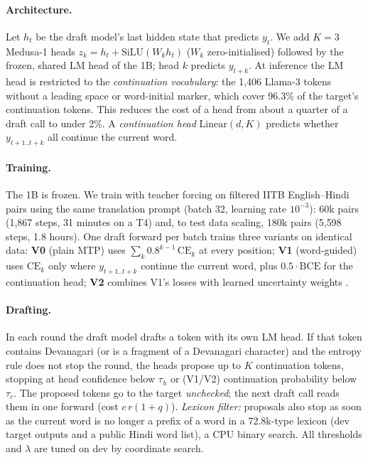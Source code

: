\documentclass[11pt]{article}
\begin{document}
\paragraph{Architecture.} Let $h_t$ be the draft model's last hidden state that predicts $y_t$. We add
$K=3$ Medusa-1 heads $z_k = h_t + \mathrm{SiLU}(W_k h_t)$ ($W_k$ zero-initialised) followed by the
frozen, shared LM head of the 1B; head $k$ predicts $y_{t+k}$. At inference the LM head is restricted
to the \emph{continuation vocabulary}: the 1{,}406 Llama-3 tokens without a leading space or
word-initial marker, which cover 96.3\% of the target's continuation tokens. This reduces the cost of a
head from about a quarter of a draft call to under 2\%. A \emph{continuation head}
$\mathrm{Linear}(d, K)$ predicts whether $y_{t+1..t+k}$ all continue the current word.

\paragraph{Training.} The 1B is frozen. We train with teacher forcing on filtered IITB English--Hindi
pairs \citep{kunchukuttan2018iitb} using the same translation prompt (batch 32, learning rate
$10^{-3}$): 60k pairs (1{,}867 steps, 31 minutes on a T4) and, to test data scaling, 180k pairs (5{,}598
steps, 1.8 hours). One draft forward per batch trains three variants on identical data:
\textbf{V0} (plain MTP) uses $\sum_k 0.8^{k-1}\,\mathrm{CE}_k$ at every position; \textbf{V1}
(word-guided) uses $\mathrm{CE}_k$ only where $y_{t+1..t+k}$ continue the current word, plus
$0.5\cdot\mathrm{BCE}$ for the continuation head; \textbf{V2} combines V1's losses with learned
uncertainty weights \citep{kendall2018multi}.

\paragraph{Drafting.} In each round the draft model drafts a token with its own LM head. If that token
contains Devanagari (or is a fragment of a Devanagari character) and the entropy rule does not stop the
round, the heads propose up to $K$ continuation tokens, stopping at head confidence below $\tau_h$ or
(V1/V2) continuation probability below $\tau_c$. The proposed tokens go to the target \emph{unchecked};
the next draft call reads them in one forward (cost $c\,r(1+q)$). \emph{Lexicon filter:} proposals also
stop as soon as the current word is no longer a prefix of a word in a 72.8k-type lexicon (dev target
outputs and a public Hindi word list), a CPU binary search. All thresholds and $\lambda$ are tuned on
dev by coordinate search.
\end{document}
